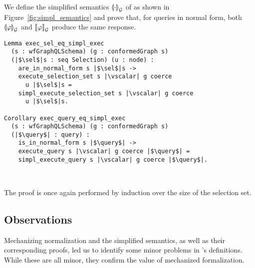 We define the simplified semantics $\llparenthesis \cdot \rrparenthesis^{}_{\mathcal{G}}$ of \HP as shown in
Figure~\ref{fig:simpl_semantics} and prove that, for queries in normal
form, both $\llparenthesis \varphi \rrparenthesis^{}_{\mathcal{G}}$ and $\llbracket \varphi \rrbracket^{}_{\mathcal{G}}$ produce the same response. 
%
\begin{verbatim}
Lemma exec_sel_eq_simpl_exec
  (s : wfGraphQLSchema) (g : conformedGraph s) 
  (|$\sel$|s : seq Selection) (u : node) :
    are_in_normal_form s |$\sel$|s -> 
    execute_selection_set s |\vscalar| g coerce
      u |$\sel$|s = 
    simpl_execute_selection_set s |\vscalar| g coerce
      u |$\sel$|s.   

Corollary exec_query_eq_simpl_exec 
  (s : wfGraphQLSchema) (g : conformedGraph s)
  (|$\query$| : query) : 
    is_in_normal_form s |$\query$| -> 
    execute_query s |\vscalar| g coerce |$\query$| =
    simpl_execute_query s |\vscalar| g coerce |$\query$|.
    
 
\end{verbatim}

\noindent The proof is once again performed by induction over the size of the selection set.

 
\subsection{Observations}\label{subsec:norm_lims}

Mechanizing normalization and the simplified semantics, as well as their corresponding proofs, led us to identify some minor problems in \HP's definitions. While these are all minor, they confirm the value of mechanized formalization.


